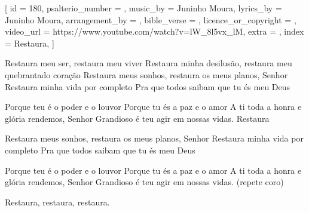 [
    id                     = {180},
    psalterio_number       = {},
    music_by               = {Juninho Moura},
    lyrics_by              = {Juninho Moura},
    arrangement_by         = {},
    bible_verse            = {},
    licence_or_copyright   = {},
    video_url              = {https://www.youtube.com/watch?v=lW_8l5vx_lM},
    extra                  = {},
    index                  = {Restaura},
]

\beginverse
Restaura meu ser, restaura meu viver
Restaura minha desilusão, restaura meu quebrantado coração
Restaura meus sonhos, restaura os meus planos, Senhor
Restaura minha vida por completo
Pra que todos saibam que tu és meu Deus
\endverse

\beginchorus
Porque teu é o poder e o louvor
Porque tu és a paz e o amor
A ti toda a honra e glória rendemos, Senhor
Grandioso é teu agir em nossas vidas. Restaura
\endchorus


\beginverse
Restaura meus sonhos, restaura os meus planos, Senhor
Restaura minha vida por completo
Pra que todos saibam que tu és meu Deus
\endverse

\beginchorus
Porque teu é o poder e o louvor
Porque tu és a paz e o amor
A ti toda a honra e glória rendemos, Senhor
Grandioso é teu agir em nossas vidas. (repete coro)

Restaura, restaura, restaura.
\endchorus

\endsong
